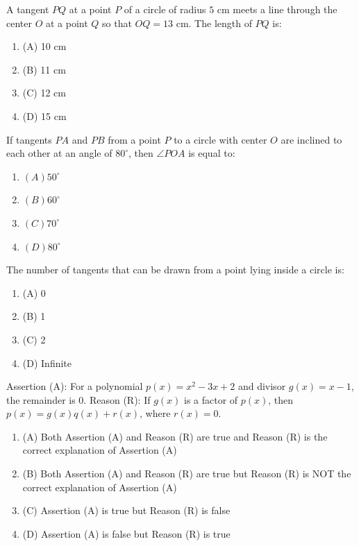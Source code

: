 \documentclass[12pt,a4paper]{exam}
\begin{document}
\begin{questions}
\question[1] A tangent $PQ$ at a point $P$ of a circle of radius $5$ cm meets a line through the center $O$ at a point $Q$ so that $OQ = 13$ cm. The length of $PQ$ is:
\begin{enumerate}[label=(\Alph*)]
  \item (A) 10 cm
  \item (B) 11 cm
  \item (C) 12 cm
  \item (D) 15 cm
\end{enumerate}
\vspace{0.15cm}

\question[1] If tangents $PA$ and $PB$ from a point $P$ to a circle with center $O$ are inclined to each other at an angle of $80^\circ$, then $\angle POA$ is equal to:
\begin{enumerate}[label=(\Alph*)]
  \item $(A) 50^\circ$
  \item $(B) 60^\circ$
  \item $(C) 70^\circ$
  \item $(D) 80^\circ$
\end{enumerate}
\vspace{0.15cm}

\question[1] The number of tangents that can be drawn from a point lying inside a circle is:
\begin{enumerate}[label=(\Alph*)]
  \item (A) 0
  \item (B) 1
  \item (C) 2
  \item (D) Infinite
\end{enumerate}
\vspace{0.15cm}

\question[1] Assertion (A): For a polynomial $p(x) = x^2 - 3x + 2$ and divisor $g(x) = x - 1$, the remainder is 0. Reason (R): If $g(x)$ is a factor of $p(x)$, then $p(x) = g(x)q(x) + r(x)$, where $r(x) = 0$.
\begin{enumerate}[label=(\Alph*)]
  \item (A) Both Assertion (A) and Reason (R) are true and Reason (R) is the correct explanation of Assertion (A)
  \item (B) Both Assertion (A) and Reason (R) are true but Reason (R) is NOT the correct explanation of Assertion (A)
  \item (C) Assertion (A) is true but Reason (R) is false
  \item (D) Assertion (A) is false but Reason (R) is true
\end{enumerate}
\vspace{0.15cm}


\end{questions}
\end{document}
